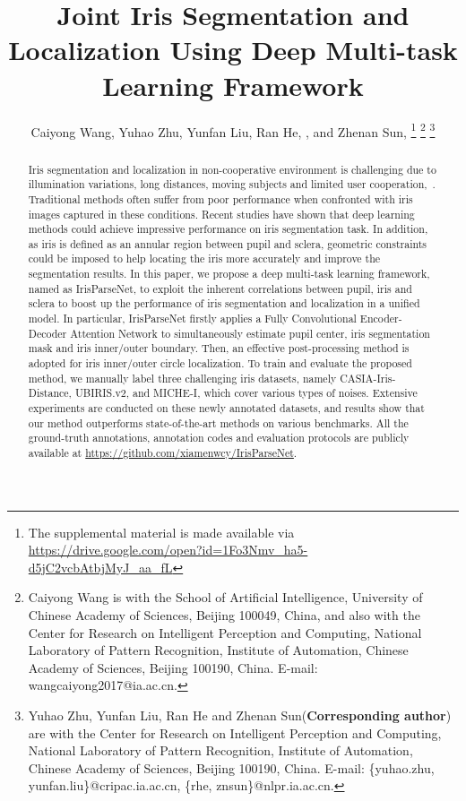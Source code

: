 \documentclass[journal]{IEEEtran}
\begin{document}
\title{Joint Iris Segmentation and Localization Using Deep Multi-task Learning Framework}  \author{Caiyong Wang, Yuhao Zhu, Yunfan Liu, Ran He, , and Zhenan Sun, 
\thanks{The supplemental material is made available via \url{https://drive.google.com/open?id=1Fo3Nmv_ha5-d5jC2vcbAtbjMyJ_aa_fL}}
\thanks{Caiyong Wang is with the School of Artificial Intelligence, University of Chinese
Academy of Sciences, Beijing 100049, China, and also with the Center for
Research on Intelligent Perception and Computing, National Laboratory of
Pattern Recognition, Institute of Automation, Chinese Academy of Sciences,
Beijing 100190, China. E-mail: wangcaiyong2017@ia.ac.cn.}
\thanks{Yuhao Zhu, Yunfan Liu, Ran He and Zhenan Sun(\textbf{Corresponding author}) are with the Center for
Research on Intelligent Perception and Computing, National Laboratory of
Pattern Recognition, Institute of Automation, Chinese Academy of Sciences,
Beijing 100190, China. E-mail: \{yuhao.zhu, yunfan.liu\}@cripac.ia.ac.cn, \{rhe, znsun\}@nlpr.ia.ac.cn.}}

\maketitle



\begin{abstract}
Iris segmentation and localization in non-cooperative environment is challenging due to illumination variations, long distances, moving subjects and limited user cooperation,~\etc. Traditional methods often suffer from poor performance when confronted with iris images captured in these conditions. Recent studies have shown that deep learning methods could achieve impressive performance on
iris segmentation task\cite{liu2016accurate,Jalilian2017Domain,Bazrafkan2018An,severo2018benchmark,arsalan2018irisdensenet}. In addition, as iris is defined as an annular region between pupil and sclera, geometric constraints could be imposed to help locating the iris more accurately and improve the segmentation results.
In this paper, we propose a deep multi-task learning framework, named as IrisParseNet, to exploit the inherent correlations between pupil, iris and sclera to boost up the performance of iris segmentation and localization in a unified model.
In particular, IrisParseNet firstly applies a Fully Convolutional Encoder-Decoder Attention Network to simultaneously estimate pupil center, iris segmentation mask and iris inner/outer boundary. Then, an effective post-processing method is adopted for iris inner/outer circle localization.
To train and evaluate the proposed method, we manually label three challenging iris datasets, namely CASIA-Iris-Distance, UBIRIS.v2, and MICHE-I, which cover various types of noises.
Extensive experiments are conducted on these newly annotated datasets, and results show that our method outperforms state-of-the-art methods on various benchmarks.
All the ground-truth annotations, annotation codes and evaluation protocols are publicly available at \url{https://github.com/xiamenwcy/IrisParseNet}.
\end{abstract}
\end{document}
